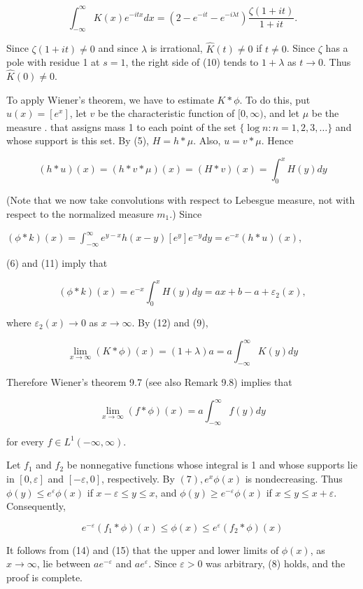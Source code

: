 \documentclass[10pt]{article}
\begin{document}
$$
\int_{-\infty}^{\infty} K(x) e^{-i t x} d x=\left(2-e^{-i t}-e^{-i \lambda t}\right) \frac{\zeta(1+i t)}{1+i t} .
$$

Since $\zeta(1+i t) \neq 0$ and since $\lambda$ is irrational, $\hat{K}(t) \neq 0$ if $t \neq 0$. Since $\zeta$ has a pole with residue 1 at $s=1$, the right side of (10) tends to $1+\lambda$ as $t \rightarrow 0$. Thus $\hat{K}(0) \neq 0$.

To apply Wiener's theorem, we have to estimate $K * \phi$. To do this, put $u(x)=\left[e^{x}\right]$, let $v$ be the characteristic function of $[0, \infty)$, and let $\mu$ be the measure . that assigns mass 1 to each point of the set $\{\log n: n=1,2,3, \ldots\}$ and whose support is this set. By (5), $H=h * \mu$. Also, $u=v * \mu$. Hence

$$
(h * u)(x)=(h * v * \mu)(x)=(H * v)(x)=\int_{0}^{x} H(y) d y
$$

(Note that we now take convolutions with respect to Lebesgue measure, not with respect to the normalized measure $m_{1}$.) Since

$(\phi * k)(x)=\int_{-\infty}^{\infty} e^{y-x} h(x-y)\left[e^{y}\right] e^{-y} d y=e^{-x}(h * u)(x)$,

(6) and (11) imply that

$$
(\phi * k)(x)=e^{-x} \int_{0}^{x} H(y) d y=a x+b-a+\varepsilon_{2}(x),
$$

where $\varepsilon_{2}(x) \rightarrow 0$ as $x \rightarrow \infty$. By (12) and (9),

$$
\lim _{x \rightarrow \infty}(K * \phi)(x)=(1+\lambda) a=a \int_{-\infty}^{\infty} K(y) d y
$$

Therefore Wiener's theorem 9.7 (see also Remark 9.8) implies that

$$
\lim _{x \rightarrow \infty}(f * \phi)(x)=a \int_{-\infty}^{\infty} f(y) d y
$$

for every $f \in L^{1}(-\infty, \infty)$.

Let $f_{1}$ and $f_{2}$ be nonnegative functions whose integral is 1 and whose supports lie in $[0, \varepsilon]$ and $[-\varepsilon, 0]$, respectively. By $(7), e^{x} \phi(x)$ is nondecreasing. Thus $\phi(y) \leq e^{\varepsilon} \phi(x)$ if $x-\varepsilon \leq y \leq x$, and $\phi(y) \geq e^{-\varepsilon} \phi(x)$ if $x \leq y \leq x+\varepsilon$. Consequently,

$$
e^{-\varepsilon}\left(f_{1} * \phi\right)(x) \leq \phi(x) \leq e^{\varepsilon}\left(f_{2} * \phi\right)(x)
$$

It follows from (14) and (15) that the upper and lower limits of $\phi(x)$, as $x \rightarrow \infty$, lie between $a e^{-\varepsilon}$ and $a e^{\varepsilon}$. Since $\varepsilon>0$ was arbitrary, (8) holds, and the proof is complete.
\end{document}
